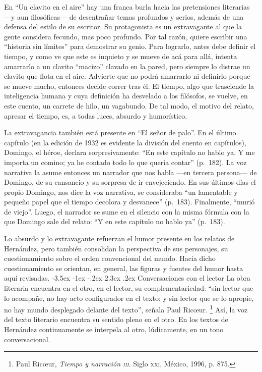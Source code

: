 \documentclass[14pt,twoside,final]{extbook} %
\makeatletter
\let\oldfootnote\footnote
\renewcommand\footnote[1]{%
\oldfootnote{\hspace{1mm}#1}}
\renewcommand\section{\@startsection {section}{1}{\z@}%
                                     {-3.5ex \@plus -1ex \@minus -.2ex}%
                                     {2.3ex \@plus .2ex}%
                                     {\normalfont\large\bfseries\sc}}
\makeatother
\begin{document}
En ``Un clavito en el aire'' hay una franca burla hacia las pretensiones literarias ---y aun filosóficas--- de desentrañar temas profundos y serios, además de una defensa del estilo de su escritor. Su protagonista es un extravagante al que la gente considera fecundo, mas poco profundo. Por tal razón, quiere escribir una ``historia sin límites'' para demostrar su genio. Para lograrlo, antes debe definir el tiempo, y como ve que este es inquieto y se mueve de acá para allá, intenta amarrarlo a un clavito ``macizo'' clavado en la pared, pero siempre lo distrae un clavito que flota en el aire. Advierte que no podrá amarrarlo ni definirlo porque se mueve mucho, entonces decide correr tras él. El tiempo, algo que trasciende la inteligencia humana y cuya definición ha desvelado a los filósofos, se vuelve, en este cuento, un carrete de hilo, un vagabundo. De tal modo, el motivo del relato, apresar el tiempo, es, a todas luces, absurdo y humorístico.

La extravagancia también está presente en ``El señor de palo''. En el último capítulo (en la edición de 1932 es evidente la división del cuento en capítulos), Domingo, el héroe, declara sorpresivamente: ``En este capítulo no hablo ya. Y me importa un comino; ya he contado todo lo que quería contar'' (p.~182). La voz narrativa la asume entonces un narrador que nos habla ---en tercera persona--- de Domingo, de su cansancio y su sorpresa de ir envejeciendo. En sus últimos días el propio Domingo, nos dice la voz narrativa, se consideraba ``un lamentable y pequeño papel que el tiempo decolora y desvanece'' (p.~183). Finalmente, ``murió de viejo''. Luego, el narrador se sume en el silencio con la misma fórmula con la que Domingo sale del relato: ``Y en este capítulo no hablo ya'' (p.~183).

Lo absurdo y lo extravagante refuerzan el humor presente en los relatos de Hernández, pero también consolidan la perspectiva de sus personajes, su cuestionamiento sobre el orden convencional del mundo. Hacia dicho cuestionamiento se orientan, en general, las figuras y fuentes del humor hasta aquí revisadas.
\section{Conversaciones con el lector}\label{sec:conversaciones-con-el-lector}
La obra literaria encuentra en el otro, en el lector, su complementariedad: ``sin lector que lo acompañe, no hay acto configurador en el texto; y sin lector que se lo apropie, no hay mundo desplegado delante del texto'', señala Paul Ric\oe ur.\footnote{Paul Ric\oe ur, \emph{Tiempo y narración \textsc{iii}}. Siglo \textsc{xxi}, México, 1996, p. 875.} Así, la voz del texto literario encuentra su sentido pleno en el otro. En los textos de Hernández continuamente se interpela al otro, lúdicamente, en un tono conversacional.
\end{document}
